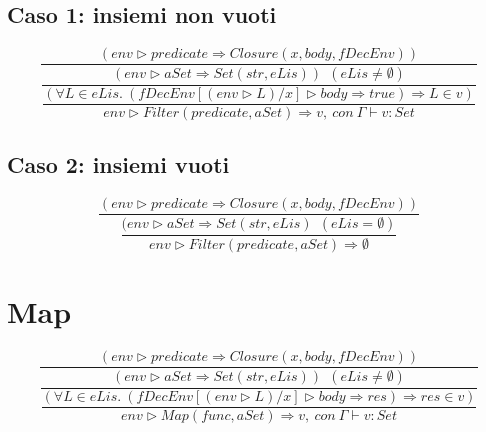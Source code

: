 \documentclass[10pt, italian, openany]{book}
\begin{document}
\subsection*{Caso 1: insiemi non vuoti}
\[
\dfrac
	{(env \rhd predicate \Longrightarrow Closure(x, body, fDecEnv)) }
	{\dfrac
		{ (env \rhd aSet \Longrightarrow Set(str, eLis)) \ \ (eLis \neq \emptyset) }
		{\dfrac
			{(\forall L \in eLis. \ (fDecEnv[ (env \rhd L) / x] \rhd body \Longrightarrow true) \Longrightarrow L \in v)}
			{env \rhd Filter(predicate, aSet) \Longrightarrow v, \ con \ \varGamma \vdash v: Set}
		} 
	}
\]
\subsection*{Caso 2: insiemi vuoti}
\[
\dfrac
	{(env \rhd predicate \Longrightarrow Closure(x, body, fDecEnv)) }
	{\dfrac
		{ (env \rhd aSet \Longrightarrow Set(str, eLis) \ \ (eLis = \emptyset)}
		{env \rhd Filter(predicate, aSet) \Longrightarrow \emptyset}
	}
\]

\section*{Map}
\[
\dfrac
	{(env \rhd predicate \Longrightarrow Closure(x, body, fDecEnv))}
	{\dfrac
		{ (env \rhd aSet \Longrightarrow Set(str, eLis)) \ \ (eLis \neq \emptyset) }
		{\dfrac
			{(\forall L \in eLis. \ (fDecEnv[ (env \rhd L) / x] \rhd body \Longrightarrow res) \Longrightarrow res \in v)}
			{env \rhd Map(func, aSet) \Longrightarrow v, \ con \ \varGamma \vdash v: Set}
		}
	}
\]
\end{document}
